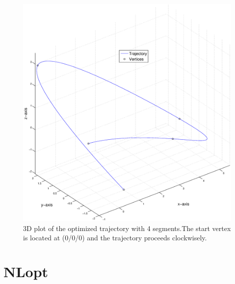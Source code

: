 \begin{figure}[H]
   \centering
   \includegraphics[trim = 36mm 30mm 33mm 30mm,clip,width=1\textwidth]{pics/4SegOptiSpace.eps}
   \caption{3D plot of the optimized trajectory with 4 segments.The start vertex is located at (0/0/0) and the trajectory proceeds clockwisely.}
    \label{pic:optiSpace} 
\end{figure}
\newpage


\section{NLopt}\label{sec:NLopt}

